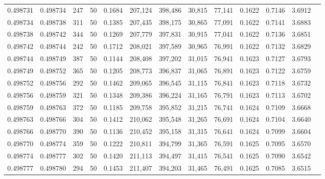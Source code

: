 \begin{tabular}{rrrrrrrrrrrrr}
0.498731 & 0.498734 & 247 &  50 &                                     0.1684 & 207,124 & 398,486 &  30,815 &  77,141 & 0.1622 & 0.7146 & 3.6912 \\
0.498734 & 0.498738 & 311 &  50 &                                     0.1385 & 207,435 & 398,175 &  30,865 &  77,091 & 0.1622 & 0.7141 & 3.6883 \\
0.498738 & 0.498742 & 344 &  50 &                                     0.1269 & 207,779 & 397,831 &  30,915 &  77,041 & 0.1622 & 0.7136 & 3.6851 \\
0.498742 & 0.498744 & 242 &  50 &                                     0.1712 & 208,021 & 397,589 &  30,965 &  76,991 & 0.1622 & 0.7132 & 3.6829 \\
0.498744 & 0.498749 & 387 &  50 &                                     0.1144 & 208,408 & 397,202 &  31,015 &  76,941 & 0.1623 & 0.7127 & 3.6793 \\
0.498749 & 0.498752 & 365 &  50 &                                     0.1205 & 208,773 & 396,837 &  31,065 &  76,891 & 0.1623 & 0.7122 & 3.6759 \\
0.498752 & 0.498756 & 292 &  50 &                                     0.1462 & 209,065 & 396,545 &  31,115 &  76,841 & 0.1623 & 0.7118 & 3.6732 \\
0.498756 & 0.498759 & 321 &  50 &                                     0.1348 & 209,386 & 396,224 &  31,165 &  76,791 & 0.1623 & 0.7113 & 3.6702 \\
0.498759 & 0.498763 & 372 &  50 &                                     0.1185 & 209,758 & 395,852 &  31,215 &  76,741 & 0.1624 & 0.7109 & 3.6668 \\
0.498763 & 0.498766 & 304 &  50 &                                     0.1412 & 210,062 & 395,548 &  31,265 &  76,691 & 0.1624 & 0.7104 & 3.6640 \\
0.498766 & 0.498770 & 390 &  50 &                                     0.1136 & 210,452 & 395,158 &  31,315 &  76,641 & 0.1624 & 0.7099 & 3.6604 \\
0.498770 & 0.498774 & 359 &  50 &                                     0.1222 & 210,811 & 394,799 &  31,365 &  76,591 & 0.1625 & 0.7095 & 3.6570 \\
0.498774 & 0.498777 & 302 &  50 &                                     0.1420 & 211,113 & 394,497 &  31,415 &  76,541 & 0.1625 & 0.7090 & 3.6542 \\
0.498777 & 0.498780 & 294 &  50 &                                     0.1453 & 211,407 & 394,203 &  31,465 &  76,491 & 0.1625 & 0.7085 & 3.6515 \\

\end{tabular}
